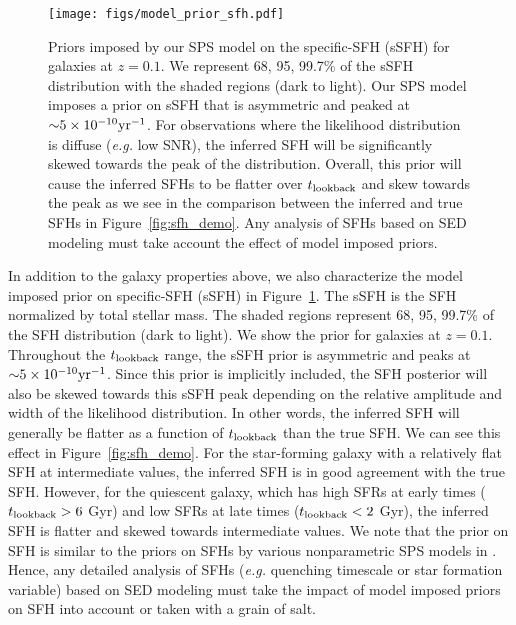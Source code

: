 \begin{figure}
\begin{center}
\texttt{[image: figs/model\_prior\_sfh.pdf]}
    \caption{
        Priors imposed by our SPS model on the specific-SFH (sSFH) for galaxies
        at $z=0.1$. 
        We represent 68, 95, 99.7\% of the sSFH distribution with the shaded
        regions (dark to light). 
        Our SPS model imposes a prior on sSFH that is asymmetric and peaked at 
        ${\sim}5\times10^{-10}{\rm yr}^{-1}$. 
        For observations where the likelihood distribution is diffuse
        (\emph{e.g.} low SNR), the inferred SFH will be significantly skewed
        towards the peak of the distribution. 
        Overall, this prior will cause the inferred SFHs to be flatter over
        $t_{\rm lookback}$ and skew towards the peak as we see in the comparison between
        the inferred and true SFHs in Figure~\ref{fig:sfh_demo}. 
        Any analysis of SFHs based on SED modeling must take account the effect
        of model imposed priors. 
    }\label{fig:sfh_prior}
\end{center}
\end{figure}
In addition to the galaxy properties above, we also characterize the model
imposed prior on specific-SFH (sSFH) in Figure~\ref{fig:sfh_prior}. 
The sSFH is the SFH normalized by total stellar mass. 
The shaded regions represent 68, 95, 99.7\% of the SFH distribution (dark to
light). 
We show the prior for galaxies at $z=0.1$. 
Throughout the $t_{\rm lookback}$ range, the sSFH prior is asymmetric and peaks at
${\sim}5\times10^{-10}{\rm yr}^{-1}$. 
Since this prior is implicitly included, the SFH posterior will also be skewed
towards this sSFH peak depending on the relative amplitude and width of the
likelihood distribution. 
In other words, the inferred SFH will generally be flatter as a function of
$t_{\rm lookback}$ than the true SFH. 
We can see this effect in Figure~\ref{fig:sfh_demo}. 
For the star-forming galaxy with a relatively flat SFH at intermediate values,
the inferred SFH is in good agreement with the true SFH. 
However, for the quiescent galaxy, which has high SFRs at early times ($t_{\rm lookback} >
6$ Gyr) and low SFRs at late times ($t_{\rm lookback} < 2$ Gyr), the inferred SFH is
flatter and skewed towards intermediate values. 
We note that the prior on SFH is similar to the priors on SFHs by various
nonparametric SPS models in \cite{leja2019}. 
Hence, any detailed analysis of SFHs (\emph{e.g.} quenching timescale or star
formation variable) based on SED modeling must take the impact of model imposed
priors on SFH into account or taken with a grain of salt.  

